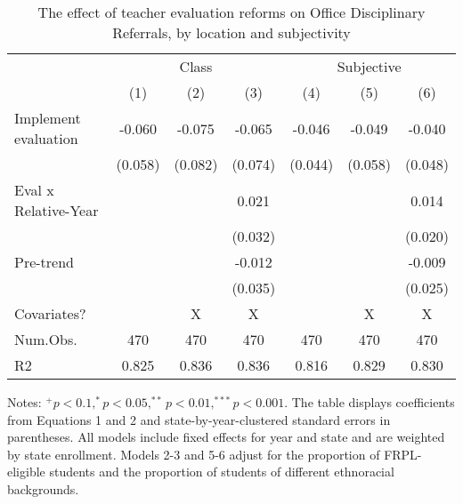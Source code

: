 \begin{table}

\caption{The effect of teacher evaluation reforms on Office Disciplinary Referrals, by location and subjectivity \label{tab:mainDD}}
\centering
\begin{threeparttable}
\begin{tabular}[t]{lcccccc}
\toprule
   & \multicolumn{3}{c}{Class} & \multicolumn{3}{c}{Subjective}\\
  & (1) & (2) & (3) & (4) & (5) & (6)\\
\midrule
Implement evaluation & -0.060 & -0.075 & -0.065 & -0.046 & -0.049 & -0.040\\
 & (0.058) & (0.082) & (0.074) & (0.044) & (0.058) & (0.048)\\
Eval x Relative-Year &  &  & 0.021 &  &  & 0.014\\
 &  &  & (0.032) &  &  & (0.020)\\
Pre-trend &  &  & -0.012 &  &  & -0.009\\
 &  &  & (0.035) &  &  & (0.025)\\
\midrule
Covariates? &  & X & X &  & X & X\\
Num.Obs. & 470 & 470 & 470 & 470 & 470 & 470\\
R2 & 0.825 & 0.836 & 0.836 & 0.816 & 0.829 & 0.830\\
\bottomrule
\end{tabular}
\begin{tablenotes}
\item Notes: $^{+}p<0.1, ^{*}p<0.05, ^{**}p<0.01, ^{***}p<0.001$. The table displays coefficients from Equations 1 and 2 and state-by-year-clustered standard errors in parentheses. All models include fixed effects for year and state and are weighted by state enrollment. Models 2-3 and 5-6 adjust for the proportion of FRPL-eligible students and the proportion of students of different ethnoracial backgrounds.
\end{tablenotes}
\end{threeparttable}
\end{table}

